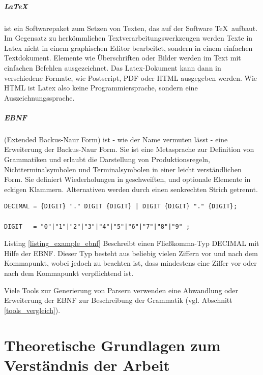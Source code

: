 \paragraph*{\LaTeX} ist ein Softwarepaket zum Setzen von Texten, das auf der Software \TeX \ aufbaut. Im Gegensatz zu herkömmlichen Textverarbeitungswerkzeugen werden Texte in Latex nicht in einem graphischen Editor bearbeitet, sondern in einem einfachen Textdokument. Elemente wie Überschriften oder Bilder werden im Text mit einfachen Befehlen ausgezeichnet. Das Latex-Dokument kann dann in verschiedene Formate, wie Postscript, PDF oder HTML ausgegeben werden. Wie HTML ist Latex also keine Programmiersprache, sondern eine Auszeichnungssprache.


\paragraph*{EBNF}
(Extended Backus-Naur Form) ist - wie der Name vermuten lässt - eine Erweiterung der Backus-Naur Form. Sie ist eine Metasprache zur Definition von Grammatiken und erlaubt die Darstellung von Produktionsregeln, Nichtterminalsymbolen und Terminalsymbolen in einer leicht verständlichen Form\cite{NiWi77}. Sie definiert Wiederholungen in geschweiften, und optionale Elemente in eckigen Klammern. Alternativen werden durch einen senkrechten Strich getrennt. 

\begin{lstlisting}[float = htbp,caption={Beschreibung eines Fließkomma-Typs in EBNF.},label=listing_example_ebnf]
DECIMAL = {DIGIT} "." DIGIT {DIGIT} | DIGIT {DIGIT} "." {DIGIT};

DIGIT   = "0"|"1"|"2"|"3"|"4"|"5"|"6"|"7"|"8"|"9" ;
\end{lstlisting}

Listing \ref{listing_example_ebnf} Beschreibt einen Fließkomma-Typ DECIMAL mit Hilfe der EBNF. Dieser Typ besteht aus beliebig vielen Ziffern vor und nach dem Kommapunkt, wobei jedoch zu beachten ist, dass mindestens eine Ziffer vor oder nach dem Kommapunkt verpflichtend ist.

Viele Tools zur Generierung von Parsern verwenden eine Abwandlung oder Erweiterung der EBNF zur Beschreibung der Grammatik (vgl. Abschnitt \ref{tools_vergleich}).




\chapter[Theoretische Grundlagen]{Theoretische Grundlagen zum Verständnis der Arbeit}

